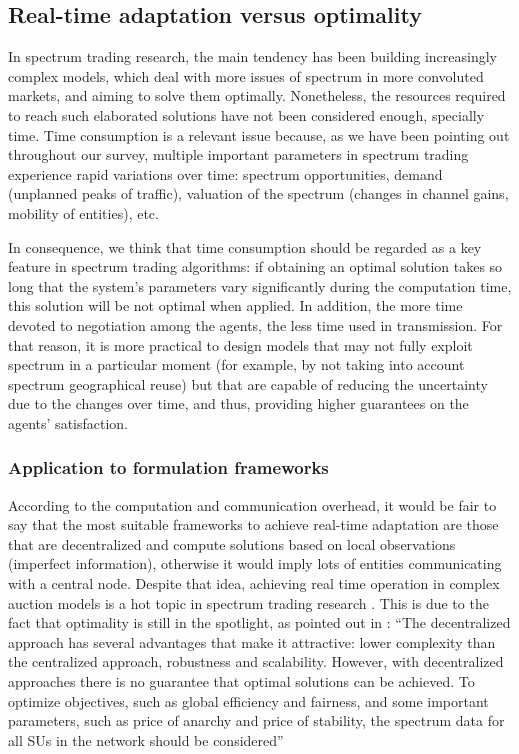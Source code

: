 \subsection{Real-time adaptation versus optimality}
In spectrum trading research, the main tendency has been building increasingly complex models, which deal with more issues of spectrum in more convoluted markets, and aiming to solve them optimally.
Nonetheless, the resources required to reach such elaborated solutions have not been considered enough, specially time. 
Time consumption is a relevant issue because, as we have been pointing out throughout our survey, multiple important parameters in spectrum trading experience rapid variations over time: spectrum opportunities, demand (unplanned peaks of traffic), valuation of the spectrum (changes in channel gains, mobility of entities), etc. 

In consequence, we think that time consumption should be regarded as a key feature in spectrum trading algorithms: if obtaining an optimal solution takes so long that the system's parameters vary significantly during the computation time, this solution will be not optimal when applied.
In addition, the more time devoted to negotiation among the agents, the less time used in transmission. 
For that reason, it is more practical to design models that may not fully exploit spectrum in a particular moment (for example, by not taking into account spectrum geographical reuse) but that are capable of reducing the uncertainty due to the changes over time, and thus, providing higher guarantees on the agents' satisfaction. 

\subsubsection{Application to formulation frameworks}
According to the computation and communication overhead, it would be fair to say that the most suitable frameworks to achieve real-time adaptation are those that are decentralized and compute solutions based on local observations (imperfect information), otherwise it would imply lots of entities communicating with a central node. 
Despite that idea, achieving real time operation in complex auction models is a hot topic in spectrum trading research \cite{ref:Vidal2013,ref:Kim2013,ref:Xu2012}. 
This is due to the fact that optimality is still in the spotlight, as pointed out in \cite{ref:Vidal2013}: ``The decentralized approach has several advantages that make it attractive: lower complexity than the centralized approach, robustness and scalability. 
However, with decentralized approaches there is no guarantee that optimal solutions can be achieved. 
To optimize objectives, such as global efficiency and fairness, and some important parameters, such as price of anarchy and price of stability, the spectrum data for all SUs in the network should be considered''

